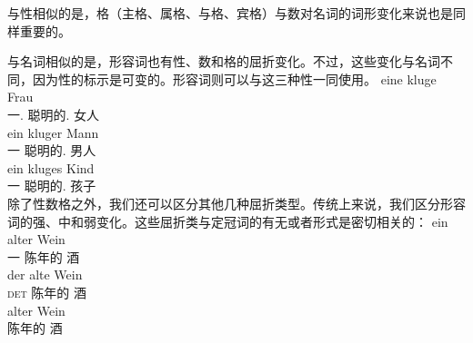 与性相似的是，格（主格、属格、与格、宾格）与数对名词的词形变化来说也是同样重要的。

与名词相似的是，形容词也有性、数和格的屈折变化。不过，这些变化与名词不同，因为性的标示是可变的。形容词则可以与这三种性一同使用。
\eal
\ex 
\gll eine kluge Frau\\
	 一.\fem{} 聪明的.\fem{} 女人\\
\ex 
\gll ein kluger Mann\\
	 一 聪明的.\mas{} 男人\\
\ex 
\gll ein kluges Kind\\
	 一 聪明的.\neu{} 孩子\\
\zl
除了性数格之外，我们还可以区分其他几种屈折类型\label{page-Flexionsklasse-Wunderlich}。传统上来说，我们区分形容词的强、中和弱变化。这些屈折类与定冠词的有无或者形式是密切相关的：
\eal
\ex 
\gll ein alter Wein\\
     一 陈年的 酒\\
\ex
\gll der alte Wein\\
     \textsc{det} 陈年的 酒\\
\ex 
\gll alter Wein\\
     陈年的 酒\\
\zl

